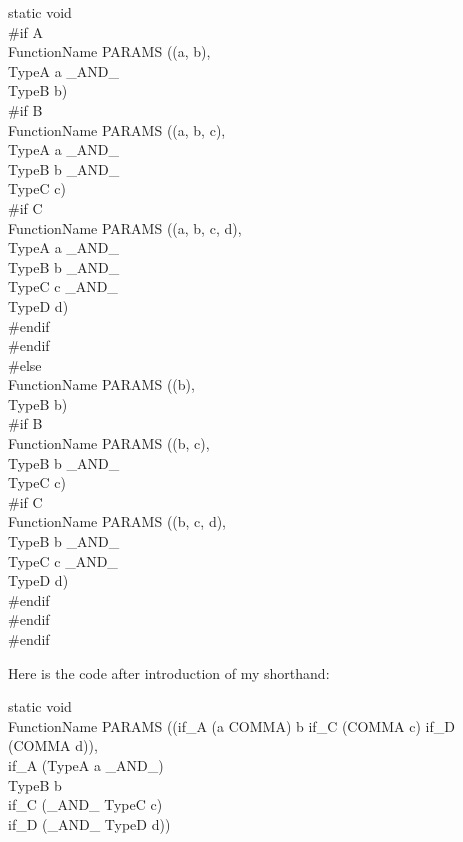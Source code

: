 \begin{Ccode}
static void\\
\#if A\\
FunctionName PARAMS ((a, b),\\
  \>TypeA a \_AND\_\\
  \>TypeB b)\\
\#if B\\
FunctionName PARAMS ((a, b, c),\\
  \>TypeA a \_AND\_\\
  \>TypeB b \_AND\_\\
  \>TypeC c)\\
\#if C\\
FunctionName PARAMS ((a, b, c, d),\\
  \>TypeA a \_AND\_\\
  \>TypeB b \_AND\_\\
  \>TypeC c \_AND\_\\
  \>TypeD d)\\
\#endif\\
\#endif\\
\#else\\
FunctionName PARAMS ((b),\\
  \>TypeB b)\\
\#if B\\
FunctionName PARAMS ((b, c),\\
  \>TypeB b \_AND\_\\
  \>TypeC c)\\
\#if C\\
FunctionName PARAMS ((b, c, d),\\
  \>TypeB b \_AND\_\\
  \>TypeC c \_AND\_\\
  \>TypeD d)\\
\#endif\\
\#endif\\
\#endif
\end{Ccode}

Here is the code after introduction of my shorthand:

\begin{Ccode}
static void\\
FunctionName PARAMS ((if\_A (a COMMA) b if\_C (COMMA c) if\_D (COMMA d)),\\
  \>if\_A (TypeA a \_AND\_)\\
  \>TypeB b\\
  \>if\_C (\_AND\_ TypeC c)\\
  \>if\_D (\_AND\_ TypeD d))
\end{Ccode}

